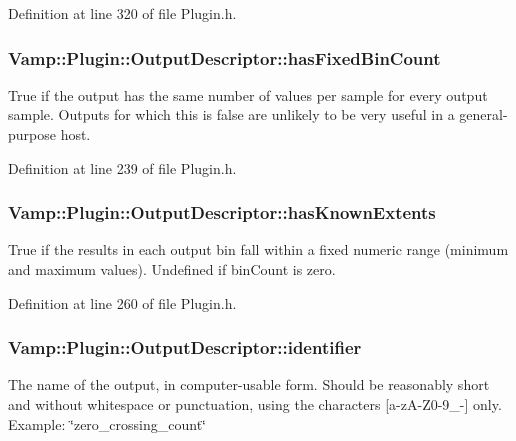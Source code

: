 Definition at line 320 of file Plugin.\+h.

\subsubsection[{\texorpdfstring{has\+Fixed\+Bin\+Count}{hasFixedBinCount}}]{ Vamp\+::\+Plugin\+::\+Output\+Descriptor\+::has\+Fixed\+Bin\+Count}\hypertarget{struct_vamp_1_1_plugin_1_1_output_descriptor_af0e577e1a256ff6eed6ea42133fec77d}{}\label{struct_vamp_1_1_plugin_1_1_output_descriptor_af0e577e1a256ff6eed6ea42133fec77d}
True if the output has the same number of values per sample for every output sample. Outputs for which this is false are unlikely to be very useful in a general-\/purpose host. 

Definition at line 239 of file Plugin.\+h.

\subsubsection[{\texorpdfstring{has\+Known\+Extents}{hasKnownExtents}}]{ Vamp\+::\+Plugin\+::\+Output\+Descriptor\+::has\+Known\+Extents}\hypertarget{struct_vamp_1_1_plugin_1_1_output_descriptor_ae9ccb65f99f477096b65dd031f4c5e31}{}\label{struct_vamp_1_1_plugin_1_1_output_descriptor_ae9ccb65f99f477096b65dd031f4c5e31}
True if the results in each output bin fall within a fixed numeric range (minimum and maximum values). Undefined if bin\+Count is zero. 

Definition at line 260 of file Plugin.\+h.

\subsubsection[{\texorpdfstring{identifier}{identifier}}]{ Vamp\+::\+Plugin\+::\+Output\+Descriptor\+::identifier}\hypertarget{struct_vamp_1_1_plugin_1_1_output_descriptor_ae2c893ddb1860589517ab7eaa989a18b}{}\label{struct_vamp_1_1_plugin_1_1_output_descriptor_ae2c893ddb1860589517ab7eaa989a18b}
The name of the output, in computer-\/usable form. Should be reasonably short and without whitespace or punctuation, using the characters \mbox{[}a-\/z\+A-\/\+Z0-\/9\+\_\+-\/\mbox{]} only. Example\+: \char`\"{}zero\+\_\+crossing\+\_\+count\char`\"{} 

